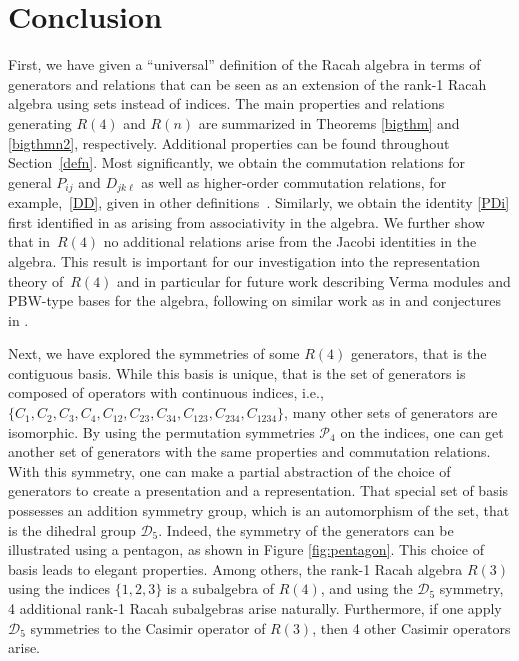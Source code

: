 \documentclass[10pt,a4paper]{amsart}
\numberwithin{equation}{section}
\begin{document}
\section{Conclusion}
First, we have given a ``universal'' definition of the Racah algebra in terms of generators and relations that can be seen as an extension of the rank-1 Racah algebra using sets instead of indices. The main properties and relations generating $R(4)$ and $R(n)$ are summarized in Theorems \ref{bigthm} and \ref{bigthmn2}, respectively. Additional properties can be found throughout Section~\ref{defn}. Most significantly, we obtain the commutation relations for general $P_{ij}$ and $D_{jk\ell}$  as well as higher-order commutation relations, for example,~\eqref{DD}, given in other definitions~\cite{CGPAV22}. Similarly, we obtain the identity \eqref{PDi} first identified in \cite{CGPAV22} as arising from associativity in the algebra. We further show that in~$R(4)$ no additional relations arise from the Jacobi identities in the algebra. This result is important for our investigation into the representation theory of~$R(4)$ and in particular for future work describing Verma modules and PBW-type bases for the algebra, following on similar work as in \cite{BCH2020, HBC2020, HBC2021} and conjectures in \cite{BGVV2018}.

Next, we have explored the symmetries of some $R(4)$ generators, that is the contiguous basis. While this basis is unique, that is the set of generators is composed of operators with continuous indices, i.e., $\lbrace C_1 ,  C_2 ,  C_3 ,  C_4 ,  C_{12} ,  C_{23} ,  C_{34} ,  C_{123} ,  C_{234} ,  C_{1234}\rbrace$, many other sets of generators are isomorphic. By using the permutation symmetries $\mathcal{P}_4$ on the indices, one can get another set of generators with the same properties and commutation relations. With this symmetry, one can make a partial abstraction of the choice of generators to create a presentation and a representation. That special set of basis possesses an addition symmetry group, which is an automorphism of the set, that is the dihedral group $\mathcal{D}_5$. Indeed, the symmetry of the generators can be illustrated using a pentagon, as shown in Figure \ref{fig:pentagon}. This choice of basis leads to elegant properties. Among others, the rank-1 Racah algebra $R(3)$ using the indices $\lbrace1,2,3\rbrace$ is a subalgebra of $R(4)$, and using the $\mathcal{D}_5$ symmetry, 4 additional rank-1 Racah subalgebras arise naturally. Furthermore, if one apply $\mathcal{D}_5$ symmetries to the Casimir operator of $R(3)$, then 4 other Casimir operators arise.
\end{document}
